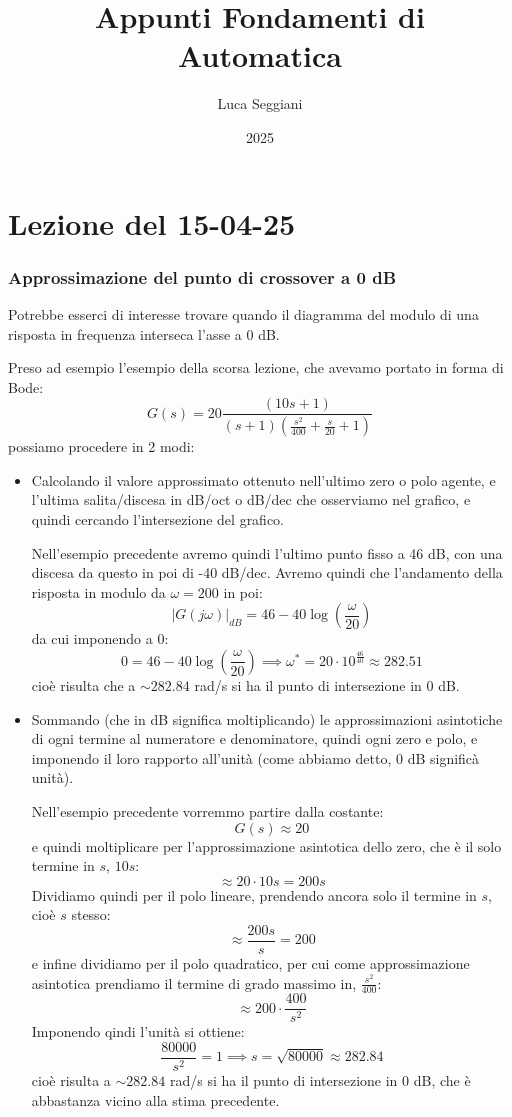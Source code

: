 \documentclass[a4paper,11pt]{article}
\title{Appunti Fondamenti di Automatica}
\author{Luca Seggiani}
\date{2025}
\begin{document}
\section{Lezione del 15-04-25}

\thispagestyle{empty}
\pagestyle{fancy}

\subsubsection{Approssimazione del punto di crossover a 0 dB}
Potrebbe esserci di interesse trovare quando il diagramma del modulo di una risposta in frequenza interseca l'asse a 0 dB.

Preso ad esempio l'esempio della scorsa lezione, che avevamo portato in forma di Bode:
$$
G(s) = 20 \frac{\left( 10s + 1 \right)}{ (s + 1) \left( \frac{s^2}{400} + \frac{s}{20} + 1 \right) } 
$$
possiamo procedere in 2 modi:
\begin{itemize}
	\item Calcolando il valore approssimato ottenuto nell'ultimo zero o polo agente, e l'ultima salita/discesa in dB/oct o dB/dec che osserviamo nel grafico, e quindi cercando l'intersezione del grafico.

		Nell'esempio precedente avremo quindi l'ultimo punto fisso a 46 dB, con una discesa da questo in poi di -40 dB/dec.
		Avremo quindi che l'andamento della risposta in modulo da $\omega = 200$ in poi:
		$$
		|G(j \omega)|_{dB} = 46 - 40 \log\left( \frac{\omega}{20} \right)
		$$
		da cui imponendo a 0:
		$$
		0 = 46 - 40 \log\left( \frac{\omega}{20} \right) \implies \omega^* = 20 \cdot 10^{\frac{46}{40}} \approx 282.51
		$$
		cioè risulta che a $\sim 282.84$ rad/s si ha il punto di intersezione in 0 dB.

	\item Sommando (che in dB significa moltiplicando) le approssimazioni asintotiche di ogni termine al numeratore e denominatore, quindi ogni zero e polo, e imponendo il loro rapporto all'unità (come abbiamo detto, 0 dB significà unità).

		Nell'esempio precedente vorremmo partire dalla costante:
		$$
		G(s) \approx 20
		$$
		e quindi moltiplicare per l'approssimazione asintotica dello zero, che è il solo termine in $s$, $10s$:
		$$
		\approx 20 \cdot 10s = 200s
		$$
		Dividiamo quindi per il polo lineare, prendendo ancora solo il termine in $s$, cioè $s$ stesso:
		$$
		\approx \frac{200s}{s} = 200
		$$
		e infine dividiamo per il polo quadratico, per cui come approssimazione asintotica prendiamo il termine di grado massimo in, $\frac{s^2}{400}$:
		$$
		\approx 200 \cdot \frac{400}{s^2}
		$$
		Imponendo qindi l'unità si ottiene:
		$$
		\frac{80000}{s^2} = 1 \implies s = \sqrt{80000} \approx 282.84
		$$
		cioè risulta a $\sim 282.84$ rad/s si ha il punto di intersezione in 0 dB, che è abbastanza vicino alla stima precedente.
\end{itemize}
\end{document}
